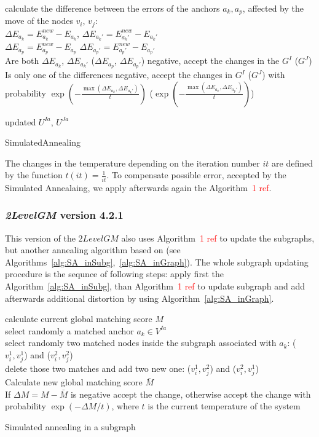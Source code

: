 \documentclass[
	fontsize=12pt,
	paper=a4,
	twoside=false,
	numbers=noenddot,
	plainheadsepline,
	toc=listof,
	toc=bibliography
]{scrartcl}
\newcommand\ToDo[1]{\textcolor{red}{#1}}
\begin{document}
\begin{algorithm}[H]
	\nl calculate the difference between the errors of the anchors $a_k, a_p$, affected by the move of the nodes $v_i$, $v_j$:\\
	    $\Delta E_{a_k} = E^{new}_{a_k} - E_{a_k}$, $\Delta E_{a_k'} = E^{new}_{a_k'} - E_{a_k'}$\\
  	    $\Delta E_{a_p} = E^{new}_{a_p} - E_{a_p}$  $\Delta E_{a_p'} = E^{new}_{a_p'} - E_{a_p'}$\\  	    
  	\nl Are both $\Delta E_{a_k}$,  $\Delta E_{a_k'}$ ($\Delta E_{a_p}$, $\Delta E_{a_p'}$) negative, accept the changes in the $G^I$ ($G^J$) \\
  	\nl Is only one of the differences negative, accept the changes in $G^I$ ($G^J$) with probability
  	 $\exp(-\frac{\max(\Delta E_{a_k}, \Delta E_{a_k'})}{t})$ ($\exp(-\frac{\max(\Delta E_{a_p}, \Delta E_{a_p'})}{t})$)

	\Return updated $U^{Ia}$, $U^{Ja}$
	
	\caption{SimulatedAnnealing}    \label{alg:sim_annealing_ver42}
\end{algorithm}

The changes in the temperature depending on the iteration number $it$ are defined by the function $t(it) = \frac{1}{it}$.
To compensate possible error, accepted by the Simulated Annealaing, we apply afterwards again the Algorithm~\ToDo{1 ref}.

\subsubsection{\emph{2LevelGM} version 4.2.1}

This version of the $2LevelGM$ also uses Algorithm~\ToDo{1 ref} to update the subgraphs, but another annealing algorithm based on \cite{herault1990_SA} (see Algorithms~\ref{alg:SA_inSubg},~\ref{alg:SA_inGraph}). The whole subgraph updating procedure is the sequnce of following steps: apply first the Algorithm~\ref{alg:SA_inSubg}, than Algorithm~\ToDo{1 ref} to update subgraph and add afterwards additional distortion by using Algorithm~\ref{alg:SA_inGraph}.

\vspace{10pt}
\begin{algorithm}[H]
	\nl calculate current global matching score $M$ \\
	\nl select randomly a matched anchor $a_k\in V^{Ia}$ \\
	\nl select randomly two matched nodes inside the subgraph associated with $a_k$: ($v^1_i, v^1_j$) and
	($v^2_i, v^2_j$) \\
	\nl delete those two matches and add two new one: ($v^1_i, v^2_j$) and ($v^2_i, v^1_j$) \\
	\nl Calculate new global matching score $\bar{M}$ \\
	\nl If $\Delta M = M - \bar{M}$ is negative accept the change, otherwise accept the change with probability $\exp(-\Delta M/t)$, where $t$ is the current temperature of the system
	\caption{Simulated annealing in a subgraph}    \label{alg:SA_inSubg}
\end{algorithm}
\end{document}
